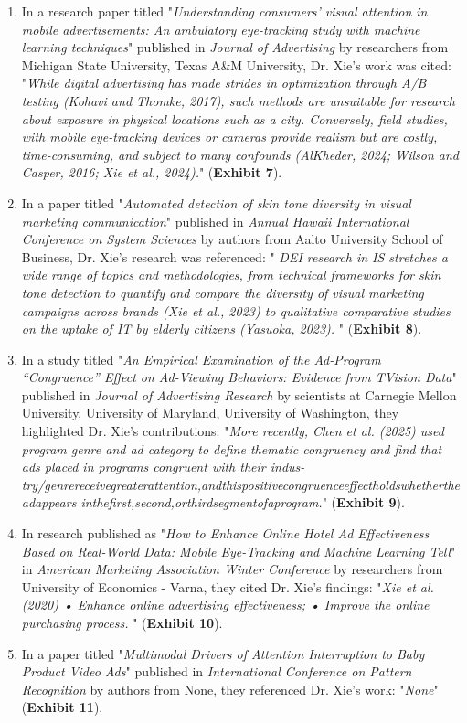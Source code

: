 \documentclass{article}
\begin{document}
\begin{enumerate}[label=• ]
    \item In a research paper titled "\textit{Understanding consumers’ visual attention in mobile advertisements: An ambulatory eye-tracking study with machine learning techniques}" published in \textit{Journal of Advertising} by researchers from Michigan State University, Texas A\&M University, Dr. Xie's work was cited: "\textit{While digital advertising has made strides in optimization through A/B testing (Kohavi and Thomke, 2017), such methods are unsuitable for research about exposure in physical locations such as a city. Conversely, field studies, with mobile eye-tracking devices or cameras provide realism but are costly, time-consuming, and subject to many confounds (AlKheder, 2024; Wilson and Casper, 2016; Xie et al., 2024).}" (\textbf{Exhibit 7}).

    \item In a paper titled "\textit{Automated detection of skin tone diversity in visual marketing communication}" published in \textit{Annual Hawaii International Conference on System Sciences} by authors from Aalto University School of Business, Dr. Xie's research was referenced: "\textit{ DEI research in IS stretches a wide range of topics and methodologies, from technical frameworks for skin tone detection to quantify and compare the diversity of visual marketing campaigns across brands (Xie et al., 2023) to qualitative comparative studies on the uptake of IT by elderly citizens (Yasuoka, 2023).  }" (\textbf{Exhibit 8}).

    \item In a study titled "\textit{An Empirical Examination of the Ad-Program “Congruence” Effect on Ad-Viewing Behaviors: Evidence from TVision Data}" published in \textit{Journal of Advertising Research } by scientists at Carnegie Mellon University, University of Maryland, University of Washington, they highlighted Dr. Xie's contributions: "\textit{More recently, Chen et al. (2025) used program genre and ad category to define thematic congruency and find that ads placed in programs congruent with their indus- try/genrereceivegreaterattention,andthispositivecongruenceeffectholdswhethertheadappears inthefirst,second,orthirdsegmentofaprogram.}" (\textbf{Exhibit 9}).

    \item In research published as "\textit{How to Enhance Online Hotel Ad Effectiveness Based on Real-World Data: Mobile Eye-Tracking and Machine Learning Tell}" in \textit{American Marketing Association Winter Conference} by researchers from University of Economics - Varna, they cited Dr. Xie's findings: "\textit{Xie et al. (2020) •  Enhance online advertising effectiveness; •  Improve the online purchasing process. }" (\textbf{Exhibit 10}).

    \item In a paper titled "\textit{Multimodal Drivers of Attention Interruption to Baby Product Video Ads}" published in \textit{International Conference on Pattern Recognition} by authors from None, they referenced Dr. Xie's work: "\textit{None}" (\textbf{Exhibit 11}).
\end{enumerate}
\end{document}
